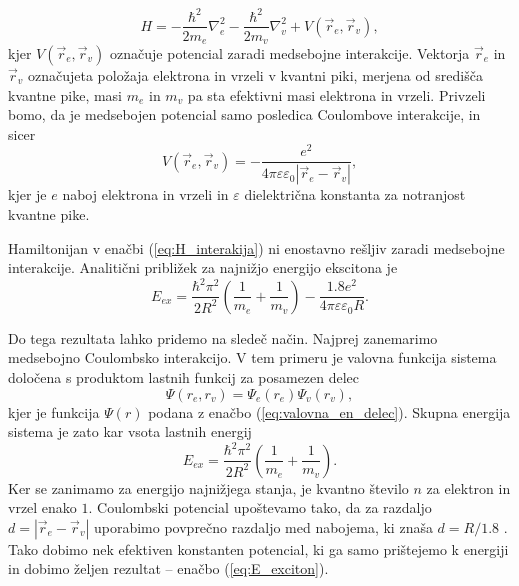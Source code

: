 \documentclass[twoside,11pt]{article}
\begin{document}
\begin{equation}
   \label{eq:H_interakija}
   H = -\frac{\hbar^2}{2m_e}\nabla_e^2 -\frac{\hbar^2}{2m_v}\nabla_v^2 + V(\vec{r}_e, \vec{r}_v), 
\end{equation}
kjer $V(\vec{r}_e, \vec{r}_v)$ označuje potencial zaradi medsebojne interakcije. Vektorja $\vec{r}_e$ in $\vec{r}_v$ označuje\-ta položaja elektrona in vrzeli v kvantni piki, merjena od središča kvantne pike, masi $m_e$ in $m_v$ pa sta efektivni masi elektrona in vrzeli. Privzeli bomo, da je medsebojen potencial
samo posledica Coulombove interakcije, in sicer
\begin{equation}
   V(\vec{r}_e, \vec{r}_v) = -\frac{e^2}{4\pi \varepsilon \varepsilon_0 |\vec{r}_e - \vec{r}_v|},
\end{equation}
kjer je $e$ naboj elektrona in vrzeli in $\varepsilon$ dielektrična konstanta za notranjost kvantne pike.

Hamiltonijan v enačbi (\ref{eq:H_interakija}) ni enostavno rešljiv zaradi medsebojne interakcije. Analitični približek za najnižjo energijo
ekscitona je \cite{doi:10.1021/j100403a003}
\begin{equation}
   \label{eq:E_exciton}
   E_{ex} = \frac{\hbar^2 \pi^2}{2R^2}\left(\frac{1}{m_e}+\frac{1}{m_v}\right) - \frac{1.8e^2}{4\pi \varepsilon \varepsilon_0 R}.
\end{equation}

Do tega rezultata lahko pridemo na sledeč način. Najprej zanemarimo medsebojno Coulombsko interakcijo. V tem primeru je valovna
funkcija sistema določena s produktom lastnih funkcij za posamezen delec \cite{glenn_rowe}
\begin{equation}
   \Psi(r_e, r_v) = \varPsi_e(r_e)\varPsi_v(r_v),
\end{equation}
kjer je funkcija $\varPsi(r)$ podana z enačbo (\ref{eq:valovna_en_delec}). Skupna energija sistema je zato kar vsota lastnih energij
\begin{equation}
   E_{ex} = \frac{\hbar^2 \pi^2}{2R^2}\left(\frac{1}{m_e}+\frac{1}{m_v}\right).
\end{equation}
Ker se zanimamo za energijo najnižjega stanja, je kvantno število $n$ za elektron in vrzel enako $1$. Coulombski potencial upoštevamo tako,
da za razdaljo $d=|\vec{r}_e - \vec{r}_v|$ uporabimo povprečno razdaljo med nabojema, ki znaša $d = R/1.8$ \cite{doi:10.1021/ed079p1094}.
Tako dobimo nek efektiven konstanten potencial, ki ga samo prištejemo k energiji in dobimo željen rezultat -- enačbo (\ref{eq:E_exciton}).
\end{document}
